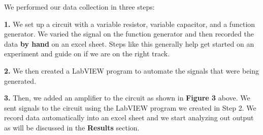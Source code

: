 \documentclass[twocolumn]{article}\usepackage[english]{babel}
\begin{document}
We performed our data collection in three steps:
\newline
\begin{Steps}
 \item{\textbf{1.} We set up a circuit with a variable resistor, variable capacitor, and  a function generator. We varied the signal on the function generator and then recorded the data \textbf{by hand} on an excel sheet. Steps like this generally help get started on an experiment and guide on if we are on the right track.} 
 \item{\textbf{2.} We then created a LabVIEW program to automate the signals that were being generated. } 
 \item{\textbf{3.} Then, we added an amplifier to the circuit as shown in \textbf{Figure 3} above. We sent signals to the circuit using the LabVIEW program we created in Step 2. We record data automatically into an excel sheet and we start analyzing out output as will be discussed in the \textbf{Results} section.}
\end{Steps} \newline
\end{document}
